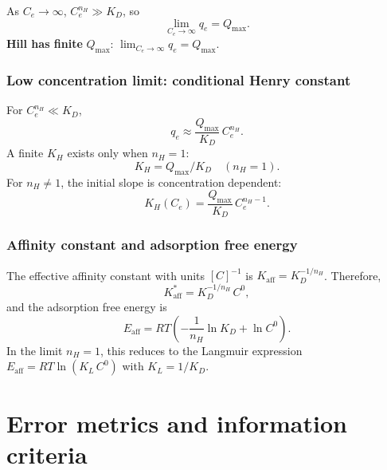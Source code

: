 \documentclass[journal=jacsat,manuscript=article]{achemso}
\begin{document}
As $C_e \to \infty$, $C_e^{n_H} \gg K_D$, so
\begin{equation}
	\lim_{C_e \to \infty} q_e = Q_{\max}.
\end{equation}
\textbf{Hill has finite }$Q_{\max}$:\quad
$\displaystyle \lim_{C_e \to \infty} q_e = Q_{\max}$.

\subsubsection{Low concentration limit: conditional Henry constant}

For $C_e^{n_H} \ll K_D$,
\begin{equation}
	q_e \approx \frac{Q_{\max}}{K_D}\, C_e^{n_H}.
\end{equation}
A finite $K_H$ exists only when $n_H = 1$:
\begin{equation}
	K_H = Q_{\max}/K_D \quad (n_H = 1).
\end{equation}
For $n_H \neq 1$, the initial slope is concentration dependent:
\begin{equation}
	K_H(C_e) = \frac{Q_{\max}}{K_D}\, C_e^{n_H - 1}.
\end{equation}

\subsubsection{Affinity constant and adsorption free energy}

The effective affinity constant with units $[C]^{-1}$ is
$K_{\mathrm{aff}} = K_D^{-1/n_H}$. Therefore,
\begin{equation}
	K_{\mathrm{aff}}^{\ast} = K_D^{-1/n_H}\, C^0,
\end{equation}
and the adsorption free energy is
\begin{equation}
	\boxed{
		E_{\mathrm{aff}} = RT\!\left(-\frac{1}{n_H}\ln K_D + \ln C^0\right).
	}
\end{equation}
In the limit $n_H = 1$, this reduces to the Langmuir expression
$E_{\mathrm{aff}} = RT\ln(K_L\, C^0)$ with $K_L = 1/K_D$.
	

	
\section{Error metrics and information criteria}
\label{sec:si_error_metrics}
\end{document}

